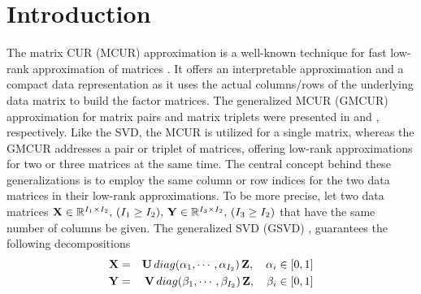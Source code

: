 \documentclass[preprint,12pt]{elsarticle}
\theoremstyle{definition}
\newcommand{\X}{{\bf X}}
\newcommand{\Y}{{\bf Y}}
\newcommand{\Z}{{\bf Z}}
\newcommand{\U}{{\bf U}}
\newcommand{\V}{{\bf V}}
\begin{document}
\section{Introduction}
The matrix CUR (MCUR) approximation is a well-known technique for fast low-rank approximation of matrices \cite{goreinov1997theory}. It offers an interpretable approximation and a compact data representation as it uses the actual columns/rows of the underlying data matrix to build the factor matrices.
 The generalized MCUR (GMCUR) approximation for matrix pairs and  matrix triplets were presented in \cite{gidisu2022generalized} and \cite{gidisu2022restricted}, respectively. Like the SVD, the MCUR is utilized for a single matrix, whereas the GMCUR addresses a pair or triplet of matrices, offering low-rank approximations for two or three matrices at the same time. The central concept behind these generalizations is to employ the same column or row indices for the two data matrices in their low-rank approximations. To be more precise, let two data matrices $\X\in\mathbb{R}^{I_1\times I_2},\,(I_1\geq I_2),\,\Y\in\mathbb{R}^{I_3\times I_2},\,(I_3\geq I_2)$ that have the same number of columns be given. The generalized SVD (GSVD) \cite{van1976generalizing,paige1981towards}, guarantees the following decompositions
\begin{eqnarray}\label{gs_1}
    \X&=&\U\,{\rm diag}(\alpha_1,\cdots,\alpha_{I_2})\,\Z,\quad \alpha_i\in[0,1]\\\label{gs_2}
    \Y&=&\V\,{\rm diag}(\beta_1,\cdots,\beta_{I_2})\,\Z,\quad\beta_i\in[0,1] 
\end{eqnarray}
\end{document}
